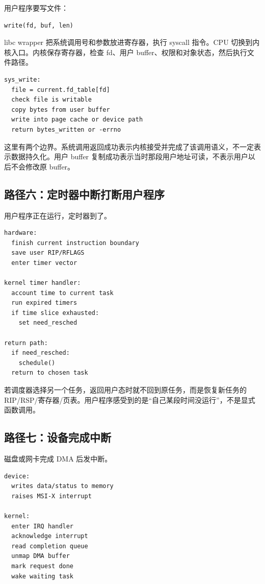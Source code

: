 用户程序要写文件：

\begin{lstlisting}
write(fd, buf, len)
\end{lstlisting}

libc wrapper 把系统调用号和参数放进寄存器，执行 syscall 指令。CPU 切换到内核入口。内核保存寄存器，检查 fd、用户 buffer、权限和对象状态，然后执行文件路径。

\begin{lstlisting}
sys_write:
  file = current.fd_table[fd]
  check file is writable
  copy bytes from user buffer
  write into page cache or device path
  return bytes_written or -errno
\end{lstlisting}

这里有两个边界。系统调用返回成功表示内核接受并完成了该调用语义，不一定表示数据持久化。用户 buffer 复制成功表示当时那段用户地址可读，不表示用户以后不会修改原 buffer。

\subsection{路径六：定时器中断打断用户程序}

用户程序正在运行，定时器到了。

\begin{lstlisting}
hardware:
  finish current instruction boundary
  save user RIP/RFLAGS
  enter timer vector

kernel timer handler:
  account time to current task
  run expired timers
  if time slice exhausted:
    set need_resched

return path:
  if need_resched:
    schedule()
  return to chosen task
\end{lstlisting}

若调度器选择另一个任务，返回用户态时就不回到原任务，而是恢复新任务的 RIP/RSP/寄存器/页表。用户程序感受到的是“自己某段时间没运行”，不是显式函数调用。

\subsection{路径七：设备完成中断}

磁盘或网卡完成 DMA 后发中断。

\begin{lstlisting}
device:
  writes data/status to memory
  raises MSI-X interrupt

kernel:
  enter IRQ handler
  acknowledge interrupt
  read completion queue
  unmap DMA buffer
  mark request done
  wake waiting task
\end{lstlisting}

